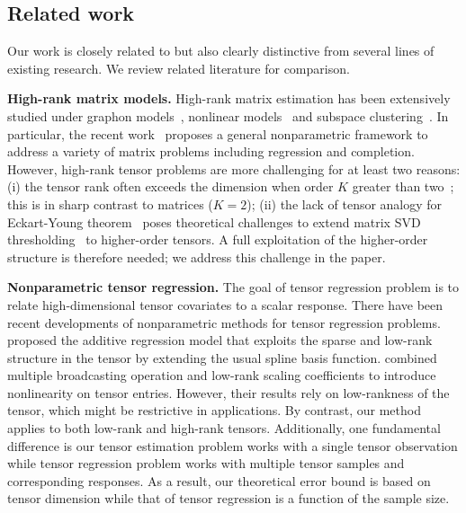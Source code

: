 \documentclass[twoside,11pt]{article}
\theoremstyle{definition}
\begin{document}
\subsection{Related work}
Our work is closely related to but also clearly distinctive from several lines of existing research. We review related literature for comparison.


{\bf High-rank matrix models.} High-rank matrix estimation has been extensively studied under graphon models~\citep{chatterjee2015matrix,zhang2017estimating}, nonlinear models~\citep{ganti2015matrix} and subspace clustering~\citep{pmlr-v70-ongie17a,fan2019online}. In particular, the recent work~\citep{lee2021nonparametric} proposes a general nonparametric framework to address a variety of matrix problems including regression and completion.
However, high-rank tensor problems are more challenging for at least two reasons: (i) the tensor rank often exceeds the dimension when order $K$ greater than two~\citep{anandkumar2017analyzing}; this is in sharp contrast to matrices ($K=2$); (ii) the lack of tensor analogy for Eckart-Young theorem~\citep{kolda2003counterexample} poses theoretical challenges to extend matrix SVD thresholding~\citep{chatterjee2015matrix,xu2018rates} to higher-order tensors. %
A full exploitation of the higher-order structure is therefore needed; we address this challenge in the paper. 

{\bf Nonparametric tensor regression.}
 The goal of tensor regression problem is to relate high-dimensional tensor covariates to a scalar response. There have been recent developments of nonparametric methods for tensor regression problems. \cite{hao2019sparse} proposed the additive regression model that exploits the sparse and low-rank structure in the tensor by extending the usual spline basis function. \cite{zhou2020broadcasted} combined multiple broadcasting operation and low-rank scaling coefficients to introduce nonlinearity on tensor entries. However, their results rely on low-rankness of the tensor, which might be restrictive in applications. By contrast, our method applies to both low-rank and high-rank tensors. Additionally, one fundamental difference is our tensor estimation problem works with a single tensor observation while tensor regression problem works with multiple tensor samples and corresponding responses. As a result, our theoretical error bound is based on tensor dimension while that of  tensor regression is a function of the sample size. %
\end{document}
